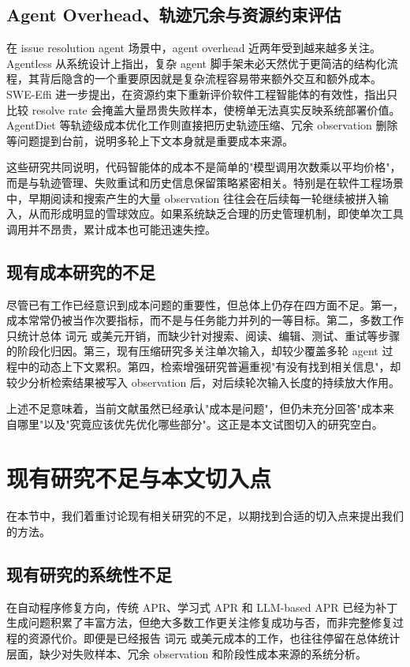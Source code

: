 \subsection{Agent Overhead、轨迹冗余与资源约束评估}

在 issue resolution agent 场景中，agent overhead 近两年受到越来越多关注。Agentless 从系统设计上指出，复杂 agent 脚手架未必天然优于更简洁的结构化流程，其背后隐含的一个重要原因就是复杂流程容易带来额外交互和额外成本。SWE-Effi 进一步提出，在资源约束下重新评价软件工程智能体的有效性，指出只比较 resolve rate 会掩盖大量昂贵失败样本，使榜单无法真实反映系统部署价值。AgentDiet 等轨迹级成本优化工作则直接把历史轨迹压缩、冗余 observation 删除等问题提到台前，说明多轮上下文本身就是重要成本来源。

这些研究共同说明，代码智能体的成本不是简单的"模型调用次数乘以平均价格"，而是与轨迹管理、失败重试和历史信息保留策略紧密相关。特别是在软件工程场景中，早期阅读和搜索产生的大量 observation 往往会在后续每一轮继续被拼入输入，从而形成明显的雪球效应。如果系统缺乏合理的历史管理机制，即使单次工具调用并不昂贵，累计成本也可能迅速失控。

\subsection{现有成本研究的不足}

尽管已有工作已经意识到成本问题的重要性，但总体上仍存在四方面不足。第一，成本常常仍被当作次要指标，而不是与任务能力并列的一等目标。第二，多数工作只统计总体 词元 或美元开销，而缺少针对搜索、阅读、编辑、测试、重试等步骤的阶段化归因。第三，现有压缩研究多关注单次输入，却较少覆盖多轮 agent 过程中的动态上下文累积。第四，检索增强研究普遍重视"有没有找到相关信息"，却较少分析检索结果被写入 observation 后，对后续轮次输入长度的持续放大作用。

上述不足意味着，当前文献虽然已经承认"成本是问题"，但仍未充分回答"成本来自哪里"以及"究竟应该优先优化哪些部分"。这正是本文试图切入的研究空白。

\section{现有研究不足与本文切入点}
在本节中，我们着重讨论现有相关研究的不足，以期找到合适的切入点来提出我们的方法。

\subsection{现有研究的系统性不足}

在自动程序修复方向，传统 APR、学习式 APR 和 LLM-based APR 已经为补丁生成问题积累了丰富方法，但绝大多数工作更关注修复成功与否，而非完整修复过程的资源代价。即便是已经报告 词元 或美元成本的工作，也往往停留在总体统计层面，缺少对失败样本、冗余 observation 和阶段性成本来源的系统分析。

